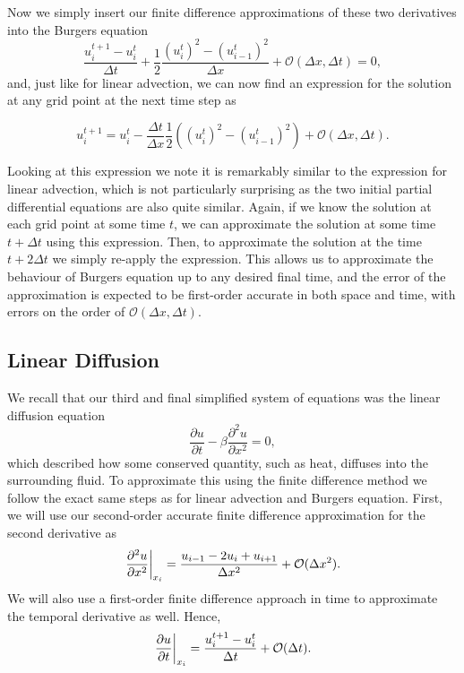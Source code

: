 Now we simply insert our finite difference approximations of these two derivatives into the Burgers equation
\begin{equation}
	\frac{u_i^{t+1} - u_{i}^t}{\Delta t} +  \frac{1}{2}\frac{(u_i^t)^2 - (u_{i-1}^t)^2}{\Delta x} + \mathcal{O}(\Delta x, \Delta t) = 0,
\end{equation}
and, just like for linear advection, we can now find an expression for the solution at any grid point at the next time step as
\begin{eqBox}
\begin{equation}
	u_i^{t+1} = u_{i}^t - \frac{\Delta t}{\Delta x} \frac{1}{2}\left( \left(u_i^t \right)^2 - \left( u_{i-1}^t \right)^2 \right) + \mathcal{O}(\Delta x, \Delta t).
	\label{eq:fd_burgers}
\end{equation}
\end{eqBox}
Looking at this expression we note it is remarkably similar to the expression for linear advection, which is not particularly surprising as the two initial partial differential equations are also quite similar. Again, if we know the solution at each grid point at some time $t$, we can approximate the solution at some time $t+\Delta t$ using this expression. Then, to approximate the solution at the time $t+2\Delta t$ we simply re-apply the expression. This allows us to approximate the behaviour of Burgers equation up to any desired final time, and the error of the approximation is expected to be first-order accurate in both space and time, with errors on the order of $\mathcal{O}(\Delta x, \Delta t)$.

\subsection{Linear Diffusion}
We recall that our third and final simplified system of equations was the linear diffusion equation
\begin{equation}
\frac{\partial u}{\partial t} - \beta \frac{\partial^2 u}{\partial x^2} = 0,
\end{equation}
which described how some conserved quantity, such as heat, diffuses into the surrounding fluid. To approximate this using the finite difference method we follow the exact same steps as for linear advection and Burgers equation. First, we will use our second-order accurate finite difference approximation for the second derivative as
\begin{equation}
	\left.\frac{\partial^2 u}{\partial x^2}\right\rvert_{x_i}^{} = \frac{u_{i-1} - 2u_i + u_{i+1}}{\Delta x^2} + \mathcal{O}(\Delta x^2).
\end{equation}
We will also use a first-order finite difference approach in time to approximate the temporal derivative as well. Hence,
\begin{equation}
	\left.\frac{\partial u}{\partial t}\right\rvert_{x_i}^{} = \frac{u_i^{t+1} - u_{i}^t}{\Delta t} + \mathcal{O}(\Delta t).
\end{equation}

